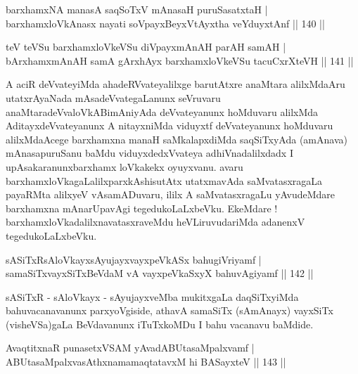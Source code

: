 \begin{shl}
barxhamxNA manasA saqSoTxV mAnasaH puruSasatxtaH | \\
barxhamxloVkAnasx nayati soV\s payxBeyxVtAyxtha veYduyxtAnf \hfill|| 140 || 
\end{shl}

\begin{shl}
teV teVSu barxhamxloVkeVSu diVpayxmAnAH parAH samAH | \\
bArxhamxmAnAH samA gArxhAyx barxhamxloVkeVSu tacuCxrXteVH \hfill|| 141 || 
\end{shl}

\begin{artha}
A aciR deVvateyiMda ahadeRVvateyalilxge barutAtxre anaMtara alilxMdaAru utatxrAyaNada mAsadeVvategaLanunx seVruvaru anaMtaradeVvaloVkABimAniyAda deVvateyanunx hoMduvaru alilxMda AditayxdeVvateyanunx A nitayxniMda viduyxtf deVvateyanunx hoMduvaru alilxMdaAcege barxhamxna manaH saMkalapxdiMda saqSiTxyAda (amAnava) mAnasapuruSanu baMdu viduyxdedxVvateya adhiVnadalilxdadx I upAsakaranunxbarxhamx loVkakekx oyuyxvanu. avaru barxhamxloVkagaLalilxparxkAshisutAtx utatxmavAda saMvatasxragaLa payaRMta alilxyeV vAsamADuvaru, ililx A saMvatasxragaLu yAvudeMdare  barxhamxna mAnarUpavAgi tegedukoLaLxbeVku. EkeMdare ! barxhamxloVkadalilxnavatasxraveMdu heVLiruvudariMda adanenxV tegedukoLaLxbeVku.
\end{artha}


\begin{shl}
sASiTxRsAloVkayxsAyujayxvayxpeVkASx bahugiVriyamf | \\
samaSiTxvayxSiTxBeVdaM vA vayxpeVkaSxyX bahuvAgiyamf \hfill|| 142 || 
\end{shl}

\begin{artha}
sASiTxR - sAloVkayx - sAyujayxveMba mukitxgaLa daqSiTxyiMda
bahuvacanavanunx parxyoVgiside, athavA samaSiTx (sAmAnayx) vayxSiTx
(visheVSa)gaLa BeVdavanunx iTuTxkoMDu I bahu vacanavu baMdide.
\end{artha}


\begin{shl}
AvaqtitxnaR punasetxVSAM yAvadABUtasaMpalxvamf | \\
ABUtasaMpalxvasAthxnamamaqtatavxM hi BASayxteV \hfill|| 143 || 
\end{shl}

